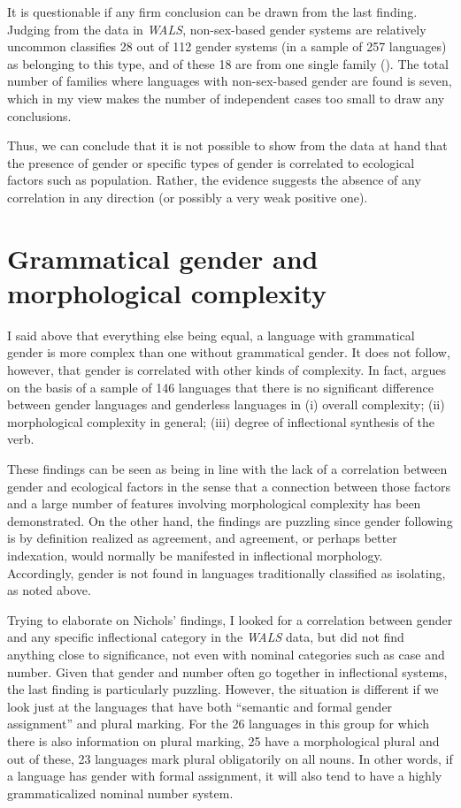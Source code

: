 \documentclass[output=collectionpaper]{langsci/langscibook}
\begin{document}
It is questionable if any firm conclusion can be drawn from the last finding. Judging from the data in \textit{WALS}, non-sex-based gender systems are relatively uncommon \textendash{} \citet{Corbett2013b} classifies 28 out of 112 gender systems (in a sample of 257 languages) as belonging to this type, and of these 18 are from one single family (). The total number of families where languages with non-sex-based gender are found is seven, which in my view makes the number of independent cases too small to draw any conclusions.

Thus, we can conclude that it is not possible to show from the data at hand that the presence of gender \textendash{} or specific types of gender \textendash{} is correlated to ecological factors such as population. Rather, the evidence suggests the absence of any correlation in any direction (or possibly a very weak positive one).

\section{Grammatical gender and morphological complexity}

I said above that everything else being equal, a language with grammatical gender is more complex than one without grammatical gender. It does not follow, however, that gender is correlated with other kinds of complexity. In fact,  argues on the basis of a sample of 146 languages that there is no significant difference between gender languages and genderless languages in (i) overall complexity; (ii) morphological complexity in general; (iii) degree of inflectional synthesis of the verb.

These findings can be seen as being in line with the lack of a correlation between gender and ecological factors in the sense that a connection between those factors and a large number of features involving morphological complexity has been demonstrated. On the other hand, the findings are puzzling since gender \textendash{} following \citet[4]{Corbett1991} \textendash{} is by definition realized as agreement, and agreement, or perhaps better indexation, would normally be manifested in inflectional morphology. Accordingly, gender is not found in languages traditionally classified as isolating, as noted above.

Trying to elaborate on Nichols’ findings, I looked for a correlation between gender and any specific inflectional category in the \textit{WALS} data, but did not find anything close to significance, not even with nominal categories such as case and number. Given that gender and number often go together in inflectional systems, the last finding is particularly puzzling. However, the situation is different if we look just at the languages that have both ``semantic and formal gender assignment'' and plural marking. For the 26 languages in this group for which there is also information on plural marking, 25 have a morphological plural and out of these, 23 languages mark plural obligatorily on all nouns. In other words, if a language has gender with formal assignment, it will also tend to have a highly grammaticalized nominal number system.
\end{document}
